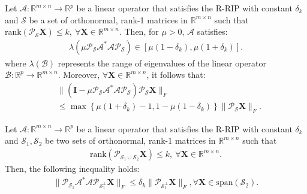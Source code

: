 \documentclass[twocolumn]{svjour3}
\newcommand{\vectornormbig}[1]{\big\|#1\big\|}
\newcommand{\sensing}{\boldsymbol{\mathcal{A}}}
\newcommand{\signal}{\boldsymbol{X}}
\newcommand{\dimension}{m \times n}
\newcommand{\numsam}{p}
\newcommand{\id}{\mathbf{I}}
\newcommand{\rank}{k}
\begin{document}
\begin{lemma}{\label{lemma:3}}\cite{Goldfarb:2011}
Let $ \sensing: \mathbb{R}^{\dimension} \rightarrow \mathbb{R}^{\numsam} $ be a linear operator that satisfies the R-RIP with constant $ \delta_{\rank} $ and $ \mathcal{S} $ be a set of orthonormal, rank-1 matrices in $\mathbb{R}^{\dimension}$ such that $ \text{rank}(\mathcal{P}_{\mathcal{S}}\signal) \leq \rank, ~\forall \signal \in \mathbb{R}^{\dimension} $. Then, for $ \mu > 0 $, $ \sensing $ satisfies:
\begin{align}
\lambda(\mu\mathcal{P}_{\mathcal{S}}\sensing^\ast \sensing \mathcal{P}_{\mathcal{S}}) \in [\mu(1-\delta_{\rank}), \mu(1+\delta_{\rank})].
\end{align} where $ \lambda(\boldsymbol{\mathcal{B}}) $ represents the range of eigenvalues of the linear operator $ \boldsymbol{\mathcal{B}}: \mathbb{R}^{\numsam} \rightarrow \mathbb{R}^{\dimension} $.
Moreover, $ \forall \signal \in \mathbb{R}^{\dimension} $, it follows that:
\begin{align}
&\vectornormbig{(\id - \mu\mathcal{P}_{\mathcal{S}}\sensing^\ast \sensing \mathcal{P}_{\mathcal{S}})\mathcal{P}_{\mathcal{S}}\signal}_F \nonumber \\ &\leq \max \left\{ \mu(1 + \delta_{\rank}) - 1, 1- \mu(1 - \delta_{\rank}) \right\} \vectornormbig{\mathcal{P}_{\mathcal{S}}\signal}_F.
\end{align}
\end{lemma}

\begin{lemma}{\label{lemma:4}}\cite{Goldfarb:2011}
Let $ \sensing: \mathbb{R}^{\dimension} \rightarrow \mathbb{R}^{\numsam} $ be a linear operator that satisfies the R-RIP with constant $ \delta_{\rank} $ and $ \mathcal{S}_1, \mathcal{S}_2 $ be two sets of orthonormal, rank-1 matrices in $\mathbb{R}^{\dimension}$ such that 
\begin{align}
\text{rank}(\mathcal{P}_{\mathcal{S}_1 \cup \mathcal{S}_2}\signal) \leq \rank, ~\forall \signal \in \mathbb{R}^{\dimension}. 
\end{align} Then, the following inequality holds:
\begin{align}
\vectornormbig{\mathcal{P}_{\mathcal{S}_1}\sensing^\ast \sensing \mathcal{P}_{\mathcal{S}_1^{\bot}}\signal}_F \leq \delta_{\rank}\vectornormbig{\mathcal{P}_{\mathcal{S}_1^{\bot}}\signal}_F, \forall \boldsymbol{X} \in \text{span}(\mathcal{S}_2).
\end{align}
\end{lemma}
\end{document}
